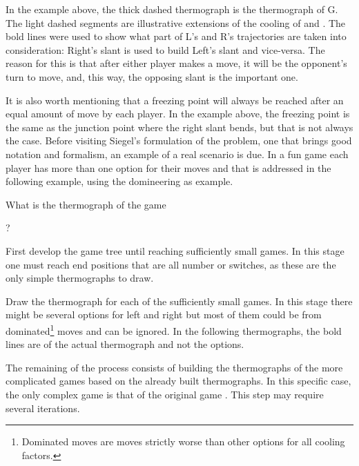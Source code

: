

In the example above, the thick dashed thermograph is the thermograph of G. The light dashed segments are illustrative extensions of the cooling of  and . The bold lines were used to show what part of L's and R's trajectories are taken into consideration: Right's slant is used to build Left's slant and vice-versa. The reason for this is that after either player makes a move, it will be the opponent's turn to move, and, this way, the opposing slant is the important one.

It is also worth mentioning that a freezing point will always be reached after an equal amount of move by each player. In the example above, the freezing point is the same as the junction point where the right slant bends, but that is not always the case. Before visiting Siegel's formulation of the problem, one that brings good notation and formalism, an example of a real scenario is due. In a fun game each player has more than one option for their moves and that is addressed in the following example, using the domineering as example. 

What is the thermograph of the game \Gm{=}
	 ? 

First develop the game tree until reaching sufficiently small games. In this stage one must reach end positions that are all number or switches, as these are the only simple thermographs to draw.



Draw the thermograph for each of the sufficiently small games. In this stage there might be several options for left and right but most of them could be from dominated\footnote{Dominated moves are moves strictly worse than other options for all cooling factors.} moves and can be ignored. In the following thermographs, the bold lines are of the actual thermograph and not the options.



The remaining of the process consists of building the thermographs of the more complicated games based on the already built thermographs. In this specific case, the only complex game is that of the original game \Gm{}. This step may require several iterations.

